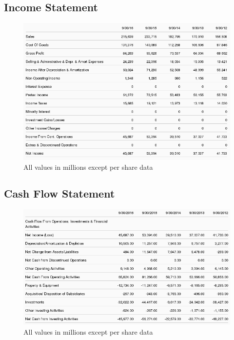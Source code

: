\documentclass[12pt,a4paper,titlepage]{article}
\begin{document}
\subsection{Income Statement}
\begin{figure}[!htb]
  \centering
  \includegraphics[width=1\textwidth]{income}
    \caption{All values in millions except per share data~\cite{zacks-income}}
\end{figure}

\newpage

\subsection{Cash Flow Statement}
\begin{figure}[!htb]
  \centering
  \includegraphics[width=1\textwidth]{cash-flow}
    \caption{All values in millions except per share data~\cite{zacks-cash}}
\end{figure}

\newpage
\end{document}
